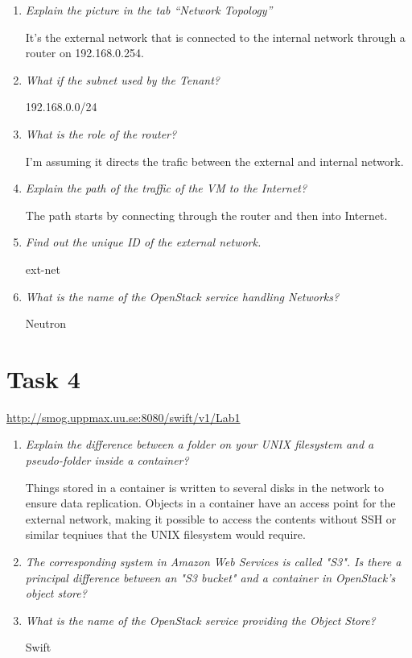 \documentclass[a4paper]{article}
\begin{document}
\begin{enumerate}
    \item \textit{Explain the picture in the tab ``Network Topology''}
    
    It's the external network that is connected to the internal network through a router on 192.168.0.254.
    \item \textit{What if the subnet used by the Tenant?}
    
    192.168.0.0/24
    \item \textit{What is the role of the router?}
    
    I'm assuming it directs the trafic between the external and internal network.
    \item \textit{Explain the path of the traffic of the VM to the Internet?}
    
    The path starts by connecting through the router and then into Internet.
    \item \textit{Find out the unique ID of the external network.}
    
    ext-net
    \item \textit{What is the name of the OpenStack service handling Networks?}
    
    Neutron
\end{enumerate}

\section*{Task 4}
\url{http://smog.uppmax.uu.se:8080/swift/v1/Lab1}
\begin{enumerate}
    \item \textit{Explain the difference between a folder on your UNIX filesystem and a pseudo-folder inside a container?}
    
    Things stored in a container is written to several disks in the network to ensure data replication. Objects in a container have an access point for the external network, making it possible to access the contents without SSH or similar teqniues that the UNIX filesystem would require. 
    \item \textit{The corresponding system in Amazon Web Services is called "S3". Is there a principal difference between an "S3 bucket" and a container in OpenStack's object store?}
    \item \textit{What is the name of the OpenStack service providing the Object Store?}
    
    Swift
\end{enumerate}
\end{document}

